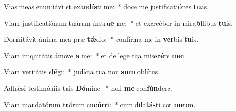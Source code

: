 \item Vias meas enuntiávi et exau\textbf{dís}ti me:~* doce me justificati\textbf{ó}nes \textbf{tu}as.
\item Viam justificatiónum tuárum ínstru\textbf{e} me:~* et exercébor in mira\textbf{bí}libus \textbf{tu}is.
\item Dormitávit ánima mea præ \textbf{tǽ}dio:~* confírma me in \textbf{ver}bis \textbf{tu}is.
\item Viam iniquitátis ámove \textbf{a} me:~* et de lege tua mise\textbf{ré}re \textbf{me}i.
\item Viam veritátis e\textbf{lé}gi:~* judícia tua non \textbf{sum} ob\textbf{lí}tus.
\item Adhǽsi testimóniis tuis \textbf{Dó}mine:~* noli \textbf{me} con\textbf{fún}dere.
\item Viam mandatórum tuórum cu\textbf{cúr}ri:~* cum dila\textbf{tás}ti cor \textbf{me}um.
